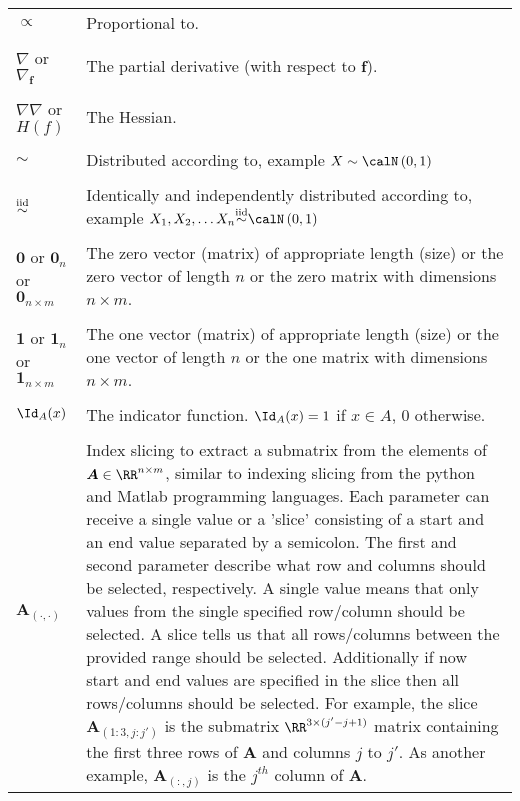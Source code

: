 \begin{longtable}{lp{}}
    $\propto$                                         & Proportional to.
    \\\\
    $\nabla$ or $\nabla_{\bm{f}}$                     & The partial derivative (with respect to $\bm{f}$).
    \\\\
    $\nabla \nabla$ or $H(f)$                         & The Hessian.
    \\\\
    $\sim$                                            & Distributed according to, example $X \sim \calN \left( 0,1 \right)$
    \\\\
    ${\overset{\text{iid}}{\sim}}$                      & Identically and independently distributed according to, example $X_1 , X_2 , \ldots X_n \iid \calN \left( 0,1 \right)$
    \\\\
    $\bm{0}$ or $\bm{0}_{n}$ or $\bm{0}_{n \times m}$ & The zero vector (matrix) of appropriate length (size) or the zero vector of length $n$ or the zero matrix with dimensions $n \times m$.
    \\\\
    $\bm{1}$ or $\bm{1}_{n}$ or $\bm{1}_{n \times m}$ & The one vector (matrix) of appropriate length (size) or the one vector of length $n$ or the one matrix with dimensions $n \times m$.
    \\\\
    $\Id_{A} (x)$                                & The indicator function. $\Id_{A} (x) = 1$ if $x \in A$, $0$ otherwise.
    \\\\
    $\bm{A}_{(\cdot,\cdot)}$                          & Index slicing to extract a submatrix from the elements of $\bm{A} \in \RR^{n \times m}$, similar to indexing slicing from the python and Matlab programming languages. Each parameter can receive a single value or a 'slice' consisting of a start and an end value separated by a semicolon. The first and second parameter describe what row and columns should be selected, respectively. A single value means that only values from the single specified row/column should be selected. A slice tells us that all rows/columns between the provided range should be selected. Additionally if now start and end values are specified in the slice then all rows/columns should be selected. For example, the slice $\bm{A}_{(1:3,j:j')}$ is the submatrix $\RR^{3 \times (j' - j + 1)}$ matrix containing the first three rows of $\bm{A}$ and columns $j$ to $j'$. As another example, $\bm{A}_{(:,j)}$ is the $j^{th}$ column of $\bm{A}$.

\end{longtable}
